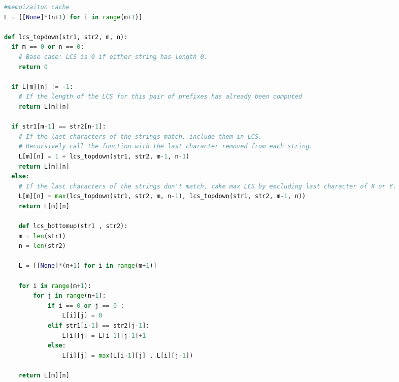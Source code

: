\documentclass[letterpaper, 8pt]{extarticle}
\makeatletter
\renewcommand{\subsection}{\@startsection{subsection}{2}{0mm}%
                                {-1explus -.5ex minus -.2ex}%
                                {0.5ex plus .2ex}%
                                {\normalfont\small\bfseries}}
\makeatother
\begin{document}
\begin{multicols*}{5}
\begin{lstlisting}[language=Python]
#memoizaiton cache
L = [[None]*(n+1) for i in range(m+1)]

def lcs_topdown(str1, str2, m, n):
  if m == 0 or n == 0:
    # Base case: LCS is 0 if either string has length 0.
    return 0
  
  if L[m][n] != -1:
    # If the length of the LCS for this pair of prefixes has already been computed
    return L[m][n]
  
  if str1[m-1] == str2[n-1]:
    # If the last characters of the strings match, include them in LCS.
    # Recursively call the function with the last character removed from each string.
    L[m][n] = 1 + lcs_topdown(str1, str2, m-1, n-1)
    return L[m][n]
  else:
    # If the last characters of the strings don't match, take max LCS by excluding last character of X or Y.
    L[m][n] = max(lcs_topdown(str1, str2, m, n-1), lcs_topdown(str1, str2, m-1, n))
    return L[m][n]

    def lcs_bottomup(str1 , str2): 
    m = len(str1) 
    n = len(str2) 

    L = [[None]*(n+1) for i in range(m+1)] 

    for i in range(m+1): 
        for j in range(n+1): 
            if i == 0 or j == 0 : 
                L[i][j] = 0
            elif str1[i-1] == str2[j-1]: 
                L[i][j] = L[i-1][j-1]+1
            else: 
                L[i][j] = max(L[i-1][j] , L[i][j-1]) 

    return L[m][n] 
\end{lstlisting}

\end{multicols*}
\end{document}

